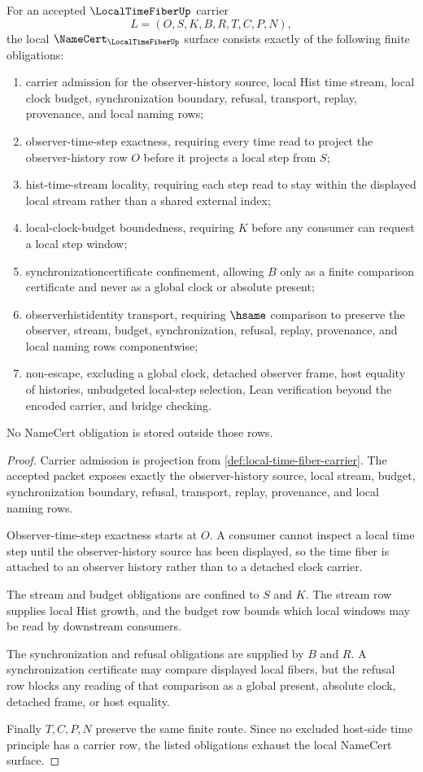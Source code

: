 \begin{theorem}
\label{thm:local-time-fiber-namecert-obligations}
For an accepted $\LocalTimeFiberUp$ carrier
$$
L=(O,S,K,B,R,T,C,P,N),
$$
the local $\NameCert_{\LocalTimeFiberUp}$ surface consists exactly of the following finite obligations:
\begin{enumerate}
\item carrier admission for the observer-history source, local Hist time stream, local clock budget, synchronization boundary, refusal, transport, replay, provenance, and local naming rows;
\item observer-time-step exactness, requiring every time read to project the observer-history row $O$ before it projects a local step from $S$;
\item hist-time-stream locality, requiring each step read to stay within the displayed local stream rather than a shared external index;
\item local-clock-budget boundedness, requiring $K$ before any consumer can request a local step window;
\item synchronizationcertificate confinement, allowing $B$ only as a finite comparison certificate and never as a global clock or absolute present;
\item observerhistidentity transport, requiring $\hsame$ comparison to preserve the observer, stream, budget, synchronization, refusal, replay, provenance, and local naming rows componentwise;
\item non-escape, excluding a global clock, detached observer frame, host equality of histories, unbudgeted local-step selection, Lean verification beyond the encoded carrier, and bridge checking.
\end{enumerate}
No NameCert obligation is stored outside those rows.
\end{theorem}
\begin{proof}
Carrier admission is projection from \autoref{def:local-time-fiber-carrier}. The accepted packet exposes exactly the observer-history source, local stream, budget, synchronization boundary, refusal, transport, replay, provenance, and local naming rows.

Observer-time-step exactness starts at $O$. A consumer cannot inspect a local time step until the observer-history source has been displayed, so the time fiber is attached to an observer history rather than to a detached clock carrier.

The stream and budget obligations are confined to $S$ and $K$. The stream row supplies local Hist growth, and the budget row bounds which local windows may be read by downstream consumers.

The synchronization and refusal obligations are supplied by $B$ and $R$. A synchronization certificate may compare displayed local fibers, but the refusal row blocks any reading of that comparison as a global present, absolute clock, detached frame, or host equality.

Finally $T,C,P,N$ preserve the same finite route. Since no excluded host-side time principle has a carrier row, the listed obligations exhaust the local NameCert surface.
\end{proof}

